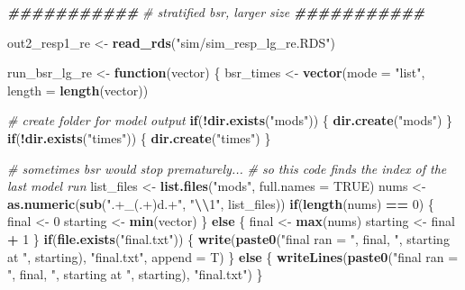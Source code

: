 \documentclass[12pt, twoside]{amherstthesis}
\newenvironment{Shaded}{\begin{snugshade}}{\end{snugshade}}
\newcommand{\AttributeTok}[1]{\textcolor[rgb]{0.13,0.29,0.53}{#1}}
\newcommand{\CommentTok}[1]{\textcolor[rgb]{0.56,0.35,0.01}{\textit{#1}}}
\newcommand{\ConstantTok}[1]{\textcolor[rgb]{0.56,0.35,0.01}{#1}}
\newcommand{\ControlFlowTok}[1]{\textcolor[rgb]{0.13,0.29,0.53}{\textbf{#1}}}
\newcommand{\DecValTok}[1]{\textcolor[rgb]{0.00,0.00,0.81}{#1}}
\newcommand{\DocumentationTok}[1]{\textcolor[rgb]{0.56,0.35,0.01}{\textbf{\textit{#1}}}}
\newcommand{\FunctionTok}[1]{\textcolor[rgb]{0.13,0.29,0.53}{\textbf{#1}}}
\newcommand{\NormalTok}[1]{#1}
\newcommand{\OtherTok}[1]{\textcolor[rgb]{0.56,0.35,0.01}{#1}}
\newcommand{\SpecialCharTok}[1]{\textcolor[rgb]{0.81,0.36,0.00}{\textbf{#1}}}
\newcommand{\StringTok}[1]{\textcolor[rgb]{0.31,0.60,0.02}{#1}}
\begin{document}
\scriptsize
\begin{Shaded}
\begin{Highlighting}[]
\DocumentationTok{\#\#\#\#\#\#\#\#\#\#\#}
\CommentTok{\# stratified bsr, larger size}
\DocumentationTok{\#\#\#\#\#\#\#\#\#\#\#}

\NormalTok{out2\_resp1\_re }\OtherTok{\textless{}{-}} \FunctionTok{read\_rds}\NormalTok{(}\StringTok{"sim/sim\_resp\_lg\_re.RDS"}\NormalTok{)}

\NormalTok{run\_bsr\_lg\_re }\OtherTok{\textless{}{-}} \ControlFlowTok{function}\NormalTok{(vector) \{}
\NormalTok{  bsr\_times }\OtherTok{\textless{}{-}} \FunctionTok{vector}\NormalTok{(}\AttributeTok{mode =} \StringTok{"list"}\NormalTok{, }\AttributeTok{length =} \FunctionTok{length}\NormalTok{(vector))}
  
  \CommentTok{\# create folder for model output}
  \ControlFlowTok{if}\NormalTok{(}\SpecialCharTok{!}\FunctionTok{dir.exists}\NormalTok{(}\StringTok{"mods"}\NormalTok{)) \{}
    \FunctionTok{dir.create}\NormalTok{(}\StringTok{"mods"}\NormalTok{)}
\NormalTok{  \}}
  \ControlFlowTok{if}\NormalTok{(}\SpecialCharTok{!}\FunctionTok{dir.exists}\NormalTok{(}\StringTok{"times"}\NormalTok{)) \{}
    \FunctionTok{dir.create}\NormalTok{(}\StringTok{"times"}\NormalTok{)}
\NormalTok{  \}}
  
  \CommentTok{\# sometimes bsr would stop prematurely...}
  \CommentTok{\# so this code finds the index of the last model run}
\NormalTok{  list\_files }\OtherTok{\textless{}{-}} \FunctionTok{list.files}\NormalTok{(}\StringTok{"mods"}\NormalTok{, }\AttributeTok{full.names =} \ConstantTok{TRUE}\NormalTok{)}
\NormalTok{  nums }\OtherTok{\textless{}{-}} \FunctionTok{as.numeric}\NormalTok{(}\FunctionTok{sub}\NormalTok{(}\StringTok{".+\_(.+)d.+"}\NormalTok{, }\StringTok{"}\SpecialCharTok{\textbackslash{}\textbackslash{}}\StringTok{1"}\NormalTok{, list\_files))}
  \ControlFlowTok{if}\NormalTok{(}\FunctionTok{length}\NormalTok{(nums) }\SpecialCharTok{==} \DecValTok{0}\NormalTok{) \{}
\NormalTok{    final }\OtherTok{\textless{}{-}} \DecValTok{0}
\NormalTok{    starting }\OtherTok{\textless{}{-}} \FunctionTok{min}\NormalTok{(vector)}
\NormalTok{  \} }\ControlFlowTok{else}\NormalTok{ \{}
\NormalTok{    final }\OtherTok{\textless{}{-}} \FunctionTok{max}\NormalTok{(nums)}
\NormalTok{    starting }\OtherTok{\textless{}{-}}\NormalTok{ final }\SpecialCharTok{+} \DecValTok{1}
\NormalTok{  \}}
  \ControlFlowTok{if}\NormalTok{(}\FunctionTok{file.exists}\NormalTok{(}\StringTok{"final.txt"}\NormalTok{)) \{}
    \FunctionTok{write}\NormalTok{(}\FunctionTok{paste0}\NormalTok{(}\StringTok{"final ran = "}\NormalTok{, final, }\StringTok{", starting at "}\NormalTok{, starting), }\StringTok{"final.txt"}\NormalTok{, }\AttributeTok{append =}\NormalTok{ T)}
\NormalTok{  \} }\ControlFlowTok{else}\NormalTok{ \{}
    \FunctionTok{writeLines}\NormalTok{(}\FunctionTok{paste0}\NormalTok{(}\StringTok{"final ran = "}\NormalTok{, final, }\StringTok{", starting at "}\NormalTok{, starting), }\StringTok{"final.txt"}\NormalTok{)}
\NormalTok{  \}}
  

\end{Highlighting}
\end{Shaded}
\end{document}
